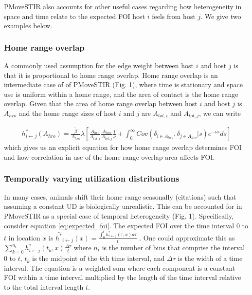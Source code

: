 \documentclass[letterpaper]{article}
\begin{document}
PMoveSTIR also accounts for other useful cases regarding how heterogeneity in space and time relate to the expected FOI host $i$ feels from host $j$.  We give two examples below.

\subsubsection*{Home range overlap}

A commonly used assumption for the edge weight between host $i$ and host $j$ is that it is proportional to home range overlap.  Home range overlap is an intermediate case of of PMoveSTIR (Fig. 1), where time is stationary and space use is uniform within a home range, and the area of contact is the home range overlap.  Given that the area of home range overlap between host $i$ and host $j$ is $A_{hro}$ and the home range sizes of host $i$ and $j$ are $A_{tot, i}$ and $A_{tot, j}$, we can write

\begin{equation}
    \begin{aligned}
    h^*_{i \leftarrow j}(A_{hro}) = \frac{\tilde{\beta}}{A_{hro}} \lambda \left[\frac{A_{hro}}{A_{tot, i}} \frac{A_{hro}}{A_{tot, j}}  \frac{1}{\nu} + \int_{0}^{\infty} Cov(\delta_{i \in A_{hro}}, \delta_{j \in A_{hro}} | s) e^{-\nu s} ds\right]
    \end{aligned}
    \label{eq:home_range}
\end{equation}
which gives us an explicit equation for how home range overlap determines FOI and how correlation in use of the home range overlap area affects FOI. 

\subsubsection*{Temporally varying utilization distributions}

In many cases, animals shift their home range seasonally (citations) such that assuming a constant UD is biologically unrealistic. This can be accounted for in PMoveSTIR as a special case of temporal heterogeneity (Fig. 1).  Specifically, consider equation \ref{eq:expected_foi}. The expected FOI over the time interval 0 to $t$ in location $x$ is $\bar{h^*}_{i \leftarrow j}(x) = \frac{\int_0^t h^*_{i \leftarrow j}(\tau, x) d\tau}{t}$ \citep{Wilber2022}.  One could approximate this as $\sum_{k = 0}^{n_t} h^*_{i \leftarrow j}(t_k, x) \frac{\Delta \tau}{t}$ where $n_t$ is the number of bins that comprise the interval 0 to $t$, $t_k$ is the midpoint of the $k$th time interval, and $\Delta \tau$ is the width of a time interval.  The equation is a weighted sum where each component is a constant FOI within a time interval multiplied by the length of the time interval relative to the total interval length $t$.  
\end{document}
